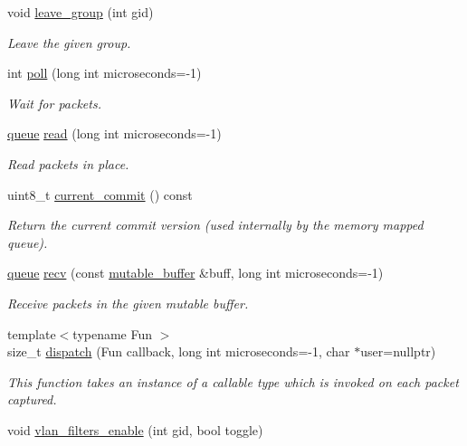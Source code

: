 \begin{DoxyCompactItemize}
void \hyperlink{classnet_1_1pfq_af90932832d9695326df7af8b2d629660}{leave\+\_\+group} (int gid)
\begin{DoxyCompactList}\small\item\em Leave the given group. \end{DoxyCompactList}\item 
int \hyperlink{classnet_1_1pfq_ae082956072242f6a05a9ba3ab076b59e}{poll} (long int microseconds=-\/1)
\begin{DoxyCompactList}\small\item\em Wait for packets. \end{DoxyCompactList}\item 
\hyperlink{classnet_1_1queue}{queue} \hyperlink{classnet_1_1pfq_aa5f1f823256285ebd45d47e454ce7bd4}{read} (long int microseconds=-\/1)
\begin{DoxyCompactList}\small\item\em Read packets in place. \end{DoxyCompactList}\item 
uint8\+\_\+t \hyperlink{classnet_1_1pfq_a31aa0b2b6221c4b70ade77ad00e2761b}{current\+\_\+commit} () const 
\begin{DoxyCompactList}\small\item\em Return the current commit version (used internally by the memory mapped queue). \end{DoxyCompactList}\item 
\hyperlink{classnet_1_1queue}{queue} \hyperlink{classnet_1_1pfq_a858804361efdbd149b838940319be49c}{recv} (const \hyperlink{namespacenet_ac0df3fa0efbc044d8a2441906e8f61cb}{mutable\+\_\+buffer} \&buff, long int microseconds=-\/1)
\begin{DoxyCompactList}\small\item\em Receive packets in the given mutable buffer. \end{DoxyCompactList}\item 
{\footnotesize template$<$typename Fun $>$ }\\size\+\_\+t \hyperlink{classnet_1_1pfq_af96974c25658386b3ad994b0de43f4b2}{dispatch} (Fun callback, long int microseconds=-\/1, char $\ast$user=nullptr)
\begin{DoxyCompactList}\small\item\em This function takes an instance of a callable type which is invoked on each packet captured. \end{DoxyCompactList}\item 
void \hyperlink{classnet_1_1pfq_ae70dad67b0f243e604ffc6d94a888454}{vlan\+\_\+filters\+\_\+enable} (int gid, bool toggle)

\end{DoxyCompactItemize}

